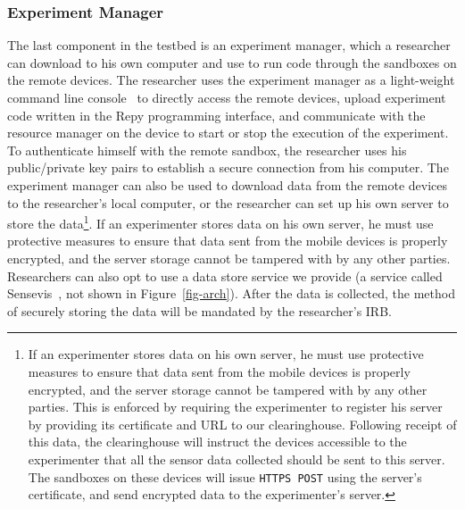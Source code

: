 %




\subsubsection{Experiment Manager}\label{sec-emt}

The last component in the testbed is an experiment manager, which a 
researcher can download to his own computer and use to run code through 
the sandboxes on the remote devices. 
The researcher uses the experiment manager as a light-weight command line 
console~\cite{demo-kit} to directly access the remote devices, upload 
experiment code written in the Repy programming interface, and
communicate with the resource manager on the device to start 
or stop the execution of the experiment. To authenticate himself with 
the remote sandbox, the researcher uses 
his public/private key pairs to establish a secure connection from his
computer. The experiment manager can also be used to download data 
from the remote devices to the researcher's local computer, or
the researcher can set up his own server to store the data\footnote{\scriptsize
If an experimenter stores data on his own server, he must use protective
measures to ensure that data sent from the mobile devices is
properly encrypted, and the server storage cannot be tampered
with by any other parties. This is enforced by requiring the experimenter to register
his server by providing its certificate and URL to our
clearinghouse. Following receipt of this data, the clearinghouse will instruct the devices
accessible to the experimenter that all the sensor data collected should be
sent to this server. The sandboxes on these devices will issue
\texttt{HTTPS POST} using the server's certificate, and send encrypted
data to the experimenter's server.}. 
If an experimenter stores data on his own server, he must use protective
measures to ensure that data sent from the mobile devices is
properly encrypted, and the server storage cannot be tampered
with by any other parties. Researchers can also opt to use a data 
store service we provide (a service called Sensevis~\cite{sensevis}, 
not shown in Figure~\ref{fig-arch}). After the data is collected, the method of 
securely storing the data will be mandated by the researcher's IRB.

